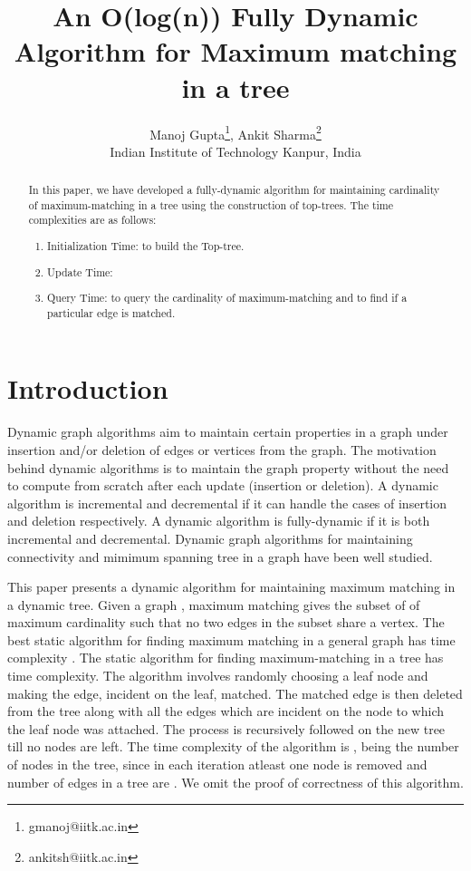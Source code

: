 \documentclass[a4paper,12pt]{article}
\title{An O(log(n)) Fully Dynamic Algorithm for Maximum matching in a tree}
\author{Manoj Gupta\footnote{gmanoj@iitk.ac.in}, Ankit Sharma\footnote{ankitsh@iitk.ac.in}\\Indian Institute of Technology Kanpur, India}
\begin{document}
\maketitle
\begin{abstract}
In this paper, we have developed a fully-dynamic algorithm for maintaining cardinality of maximum-matching in a tree using the construction of top-trees. The time complexities are as follows:
\begin{enumerate}
\item Initialization Time:  to build the Top-tree.
\item Update Time: 
\item Query Time:  to query the cardinality of maximum-matching and  to find if a particular edge is matched.
\end{enumerate}
\end{abstract}
\section{Introduction}
Dynamic graph algorithms aim to maintain certain properties in a graph under insertion and/or deletion of edges or vertices from the graph. The motivation behind dynamic algorithms is to maintain the graph property without the need to compute from scratch after each update (insertion or deletion). A dynamic algorithm is incremental and decremental if it can handle the cases of insertion and deletion respectively. A dynamic algorithm is fully-dynamic if it is both incremental and decremental. Dynamic graph algorithms for maintaining connectivity and mimimum spanning tree in a graph have been well studied.

This paper presents a dynamic algorithm for maintaining maximum matching in a dynamic tree. Given a graph , maximum matching gives the subset of  of maximum cardinality such that no two edges in the subset share a vertex. The best static algorithm for finding maximum matching in a general graph has  time complexity \cite{maxmatch-static}. The static algorithm for finding maximum-matching in a tree has  time complexity. The algorithm involves randomly choosing a leaf node and making the edge, incident on the leaf, matched. The matched edge is then deleted from the tree along with all the edges which are incident on the node to which the leaf node was attached. The process is recursively followed on the new tree till no nodes are left. The time complexity of the algorithm is ,  being the number of nodes in the tree, since in each iteration atleast one node is removed and number of edges in a tree are . We omit the proof of correctness of this algorithm.
\end{document}
